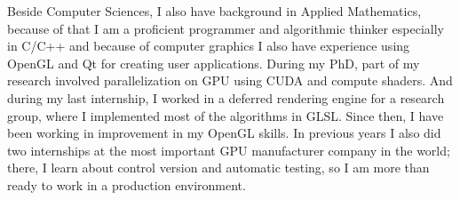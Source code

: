 \documentclass[10pt,stdletter,dateno,sigleft,letterpaper]{newlfm} %
\begin{document}
\begin{newlfm}
Beside Computer Sciences, I also have background in Applied Mathematics, because of that I am a proficient programmer and algorithmic thinker especially in C/C++ and because of computer graphics I also have experience using OpenGL and Qt for creating user applications. During my PhD, part of my research involved parallelization on GPU using CUDA and compute shaders. And during my last internship, I worked in a deferred rendering engine for a research group, where I implemented most of the algorithms in GLSL. Since then, I have been working in improvement in my OpenGL skills. In previous years I also did two internships at the most important GPU manufacturer company in the world; there, I learn about control version and automatic testing, so I am more than ready to work in a production environment.



\end{newlfm}
\end{document}

